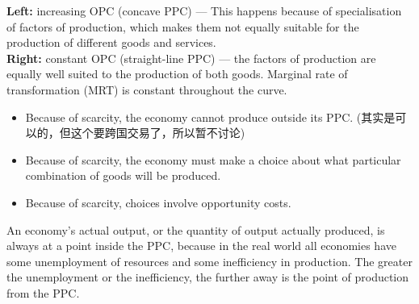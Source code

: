 \documentclass[a4paper,12pt]{article}
\begin{document}
\begin{center}
\end{center}
\textbf{Left:} increasing OPC (concave PPC) --- This happens because of specialisation of factors of production, which makes them not equally suitable for the production of different goods and services.\\
\textbf{Right:} constant OPC (straight-line PPC) --- the factors of production are equally well suited to the production of both goods. Marginal rate of transformation (MRT) is constant throughout the curve.
\begin{itemize}
  \item Because of scarcity, the economy cannot produce outside its PPC. (其实是可以的，但这个要跨国交易了，所以暂不讨论)
  \item Because of scarcity, the economy must make a choice about what particular combination of goods will be produced.
  \item Because of scarcity, choices involve opportunity costs.
\end{itemize}
An economy's actual output, or the quantity
of output actually produced, is always at a point inside the PPC, because in the real world all economies have some unemployment of resources and some inefficiency in production. The greater the unemployment or the inefficiency, the further away is the point of production from the PPC.\\\\
\end{document}

